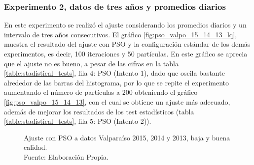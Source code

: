 \subsubsection{Experimento 2, datos de tres años y promedios diarios}
En este experimento se realizó el ajuste considerando los promedios diarios y un intervalo de tres años consecutivos. El gráfico \ref{fig:pso_valpo_15_14_13_lq}, muestra el resultado del ajuste con PSO y la configuración estándar de los demás experimentos, es decir, 100 iteraciones y 50 partículas. En este gráfico se aprecia que el ajuste no es bueno, a pesar de las cifras en la tabla \ref{table:stadistical_tests}, fila 4: PSO (Intento 1), dado que oscila bastante alrededor de las barras del histograma, por lo que se repite el experimento aumentando el número de partículas a 200 obteniendo el gráfico \ref{fig:pso_valpo_15_14_13}, con el cual se obtiene un ajuste más adecuado, además de mejorar los resultados de los test estadísticos (tabla \ref{table:stadistical_tests}, fila 5: PSO (Intento 2)).\\
\begin{figure}[ht!]
    \centering
    \caption{Ajuste con PSO a datos Valparaíso 2015, 2014 y 2013, baja y buena calidad.\\ Fuente: Elaboración Propia.}
    \label{fig:subfigures}
\end{figure}

